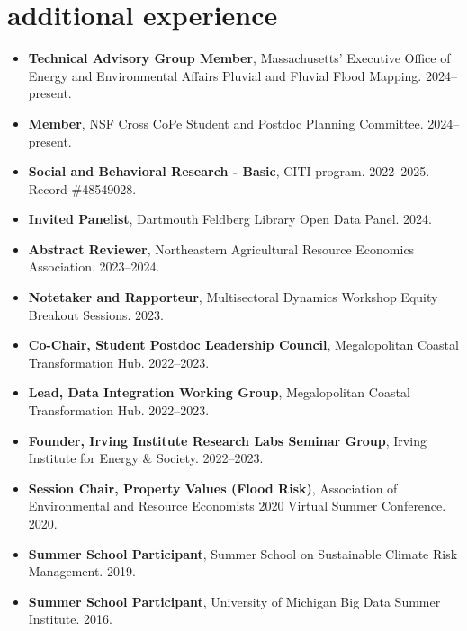 \documentclass[10pt,oneside]{article}
\begin{document}

\section{additional experience}

\mbox{}\vspace{-\dimexpr\baselineskip\relax}

\begin{itemize}[label={}]
  
  \item \textbf{Technical Advisory Group Member}, Massachusetts’ Executive Office of Energy and Environmental Affairs Pluvial and Fluvial Flood Mapping. 2024--present.
  
  \item \textbf{Member}, NSF Cross CoPe Student and Postdoc Planning Committee. 2024--present.
  
  \item \textbf{Social and Behavioral Research - Basic}, CITI program. 2022--2025.\\Record \#48549028.
  
  \item \textbf{Invited Panelist}, Dartmouth Feldberg Library Open Data Panel. 2024.
  
  \item \textbf{Abstract Reviewer}, Northeastern Agricultural Resource Economics Association. 2023--2024.
  
  \item \textbf{Notetaker and Rapporteur}, Multisectoral Dynamics Workshop Equity Breakout Sessions. 2023.
  
  \item \textbf{Co-Chair, Student Postdoc Leadership Council}, Megalopolitan Coastal Transformation Hub. 2022--2023.
  
  \item \textbf{Lead, Data Integration Working Group}, Megalopolitan Coastal Transformation Hub. 2022--2023.
  
  \item \textbf{Founder, Irving Institute Research Labs Seminar Group}, Irving Institute for Energy \& Society. 2022--2023.
  
  \item \textbf{Session Chair, Property Values (Flood Risk)}, Association of Environmental and Resource Economists 2020 Virtual Summer Conference. 2020.
  
  \item \textbf{Summer School Participant}, Summer School on Sustainable Climate Risk Management. 2019.
  
  \item \textbf{Summer School Participant}, University of Michigan Big Data Summer Institute. 2016.
  
\end{itemize}
\end{document}
